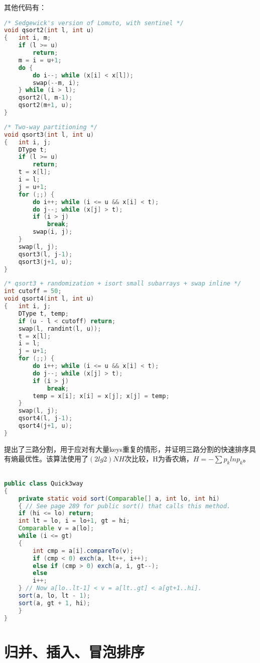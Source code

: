 其他代码有：

\begin{lstlisting}[language=C++]
/* Sedgewick's version of Lomuto, with sentinel */
void qsort2(int l, int u)
{	int i, m;
	if (l >= u)
		return;
	m = i = u+1;
	do {
		do i--; while (x[i] < x[l]);
		swap(--m, i);
	} while (i > l);
	qsort2(l, m-1);
	qsort2(m+1, u);
}
\end{lstlisting}


\begin{lstlisting}[language=C++]
/* Two-way partitioning */
void qsort3(int l, int u)
{	int i, j;
	DType t;
	if (l >= u)
		return;
	t = x[l];
	i = l;
	j = u+1;
	for (;;) {
		do i++; while (i <= u && x[i] < t);
		do j--; while (x[j] > t);
		if (i > j)
			break;
		swap(i, j);
	}
	swap(l, j);
	qsort3(l, j-1);
	qsort3(j+1, u);
}
\end{lstlisting}


\begin{lstlisting}[language=C++]
/* qsort3 + randomization + isort small subarrays + swap inline */
int cutoff = 50;
void qsort4(int l, int u)
{	int i, j;
	DType t, temp;
	if (u - l < cutoff) return;
	swap(l, randint(l, u));
	t = x[l];
	i = l;
	j = u+1;
	for (;;) {
		do i++; while (i <= u && x[i] < t);
		do j--; while (x[j] > t);
		if (i > j)
			break;
		temp = x[i]; x[i] = x[j]; x[j] = temp;
	}
	swap(l, j);
	qsort4(l, j-1);
	qsort4(j+1, u);
}

\end{lstlisting}

\cite{sedgewick}提出了三路分割，用于应对有大量keys重复的情形，并证明三路分割的快速排序具有熵最优性。该算法使用了$(2lg2)NH$次比较，H为香农熵，$H=-\sum{p_{k}lnp_k}$。


\begin{lstlisting}[language=Java]

public class Quick3way
{
    private static void sort(Comparable[] a, int lo, int hi)
    { // See page 289 for public sort() that calls this method.
	if (hi <= lo) return;
	int lt = lo, i = lo+1, gt = hi;
	Comparable v = a[lo];
	while (i <= gt)
	{
	    int cmp = a[i].compareTo(v);
	    if (cmp < 0) exch(a, lt++, i++);
	    else if (cmp > 0) exch(a, i, gt--);
	    else
	    i++;
	} // Now a[lo..lt-1] < v = a[lt..gt] < a[gt+1..hi].
	sort(a, lo, lt - 1);
	sort(a, gt + 1, hi);
    }
}
\end{lstlisting}

\section{归并、插入、冒泡排序}

